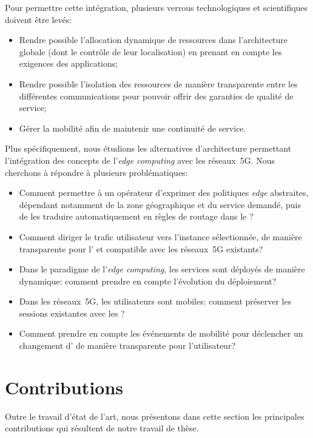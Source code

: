 \documentclass[../main.tex]{subfiles}
\begin{document}
Pour permettre cette intégration, plusieurs verrous technologiques et scientifiques doivent être levés:
\begin{itemize}
    \item Rendre possible l’allocation dynamique de ressources dans l’architecture globale (dont le contrôle de leur localisation) en prenant en compte les exigences des applications;
    \item Rendre possible l’isolation des ressources de manière transparente entre les différentes communications pour pouvoir offrir des garanties de qualité de service;
    \item Gérer la mobilité afin de maintenir une continuité de service.
\end{itemize}
\endgroup

\pagebreak
Plus spécifiquement, nous étudions les alternatives d’architecture permettant l’intégration des concepts de l’\textit{edge computing} avec les réseaux~5G.
Nous cherchons à répondre à plusieurs problématiques:
\begin{itemize}
    \item Comment permettre à un opérateur d’exprimer des politiques \textit{edge} abstraites, dépendant notamment de la zone géographique et du service demandé, puis de les traduire automatiquement en règles de routage dans le ?
    \item Comment diriger le trafic utilisateur vers l’instance sélectionnée, de manière transparente pour l’ et compatible avec les réseaux~5G existants?
    \item Dans le paradigme de l’\textit{edge computing}, les services sont déployés de manière dynamique: comment prendre en compte l’évolution du déploiement?
    \item Dans les réseaux~5G, les utilisateurs sont mobiles: comment préserver les sessions existantes avec les ?
    \item Comment prendre en compte les événements de mobilité pour déclencher un changement d’ de manière transparente pour l’utilisateur?
\end{itemize}

\section*{Contributions}
Outre le travail d’état de l’art, nous présentons dans cette section les principales contributions qui résultent de notre travail de thèse.
\end{document}
